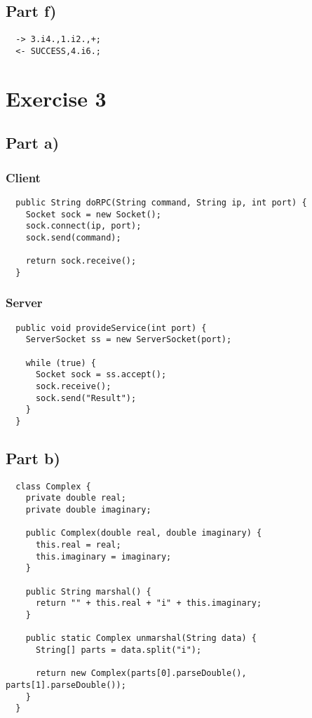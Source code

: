 \documentclass[10pt,a4paper]{article}
\begin{document}
\subsection*{Part f)}

\begin{verbatim}
  -> 3.i4.,1.i2.,+;
  <- SUCCESS,4.i6.;
\end{verbatim}

\section*{Exercise 3}

\subsection*{Part a)}

\subsubsection*{Client}

\begin{verbatim}
  public String doRPC(String command, String ip, int port) {
    Socket sock = new Socket();
    sock.connect(ip, port);
    sock.send(command);

    return sock.receive();
  }
\end{verbatim}

\subsubsection*{Server}

\begin{verbatim}
  public void provideService(int port) {
    ServerSocket ss = new ServerSocket(port);

    while (true) {
      Socket sock = ss.accept();
      sock.receive();
      sock.send("Result");
    }
  }
\end{verbatim}

\subsection*{Part b)}

\begin{verbatim}
  class Complex {
    private double real;
    private double imaginary;

    public Complex(double real, double imaginary) {
      this.real = real;
      this.imaginary = imaginary;
    }

    public String marshal() {
      return "" + this.real + "i" + this.imaginary;
    }

    public static Complex unmarshal(String data) {
      String[] parts = data.split("i");

      return new Complex(parts[0].parseDouble(), parts[1].parseDouble());
    }
  }
\end{verbatim}
\end{document}
